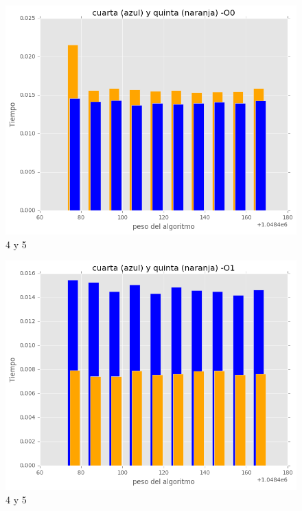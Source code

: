 \documentclass[a4paper, 11pt]{article}
\begin{document}
\begin{figure}[!hbp]
	\includegraphics[scale=0.6]{4y5p.png}
	\caption{4 y 5	\label{4y5p}}
\end{figure} 
\begin{figure}[!hbp]
	\includegraphics[scale=0.6]{4y5p_1.png}
	\caption{4 y 5	\label{4y5p_1}}
\end{figure} 
\end{document}
